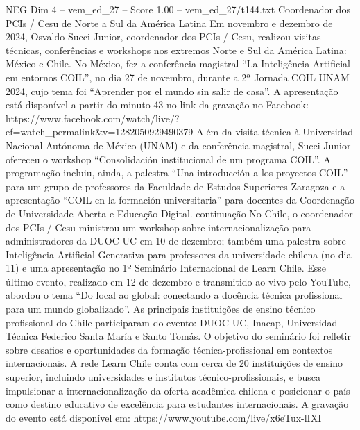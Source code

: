 \begin{textsample}{NEG Dim 4 – vem\_ed\_27 – Score 1.00 – vem\_ed\_27/t144.txt}  \label{ex:f4_neg_148}
Coordenador dos PCIs / Cesu de Norte a Sul da América Latina Em novembro e dezembro de 2024, Osvaldo Succi Junior, coordenador dos PCIs / Cesu, realizou visitas técnicas, conferências e workshops nos extremos Norte e Sul da América Latina: México e Chile.
No México, fez a conferência magistral “La Inteligência Artificial em entornos COIL”, no dia 27 de novembro, durante a 2ª Jornada COIL UNAM 2024, cujo tema foi “Aprender por el mundo sin salir de casa”.
A apresentação está disponível a partir do minuto 43 no link da gravação no Facebook: https://www.facebook.com/watch/live/?ef=watch\_permalink\&v=1282050929490379 Além da visita técnica à Universidad Nacional Autónoma de México (UNAM) e da conferência magistral, Succi Junior ofereceu o workshop “Consolidación institucional de um programa COIL”.
A programação incluiu, ainda, a palestra “Una introducción a los proyectos COIL” para um grupo de professores da Faculdade de Estudos Superiores Zaragoza e a apresentação “COIL en la formación universitaria” para docentes da Coordenação de Universidade Aberta e Educação Digital. continuação No Chile, o coordenador dos PCIs / Cesu ministrou um workshop sobre internacionalização para administradores da DUOC UC em 10 de dezembro; também uma palestra sobre Inteligência Artificial Generativa para professores da universidade chilena (no dia 11) e uma apresentação no 1º Seminário Internacional de Learn Chile.
Esse último evento, realizado em 12 de dezembro e transmitido ao vivo pelo YouTube, abordou o tema “Do local ao global: conectando a docência técnica profissional para um mundo globalizado”.
As principais instituições de ensino técnico profissional do Chile participaram do evento: DUOC UC, Inacap, Universidad Técnica Federico Santa María e Santo Tomás.
O objetivo do seminário foi refletir sobre desafios e oportunidades da formação técnica-profissional em contextos internacionais.
A rede Learn Chile conta com cerca de 20 instituições de ensino superior, incluindo universidades e institutos técnico-profissionais, e busca impulsionar a internacionalização da oferta acadêmica chilena e posicionar o país como destino educativo de excelência para estudantes internacionais.
A gravação do evento está disponível em: https://www.youtube.com/live/x6eTux-lIXI

\end{textsample}
